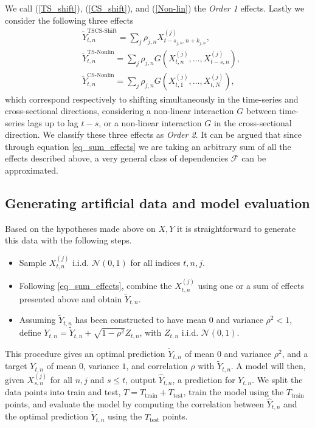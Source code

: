 \documentclass{article}
\begin{document}
We call (\ref{TS_shift}), (\ref{CS_shift}), and (\ref{Non-lin}) the \textit{Order 1} effects. Lastly we consider the following three effects
\begin{align}\label{tscs_shift}
&\widetilde Y_{t,n}^{\text{TSCS-Shift}} = \sum_j \rho_{j,n} X_{t-s_{j,n},n+k_{j,n}}^{(j)},\\
&\widetilde Y_{t,n}^{\text{TS-Nonlin}} = \sum_j \rho_{j,n} G(X_{t,n}^{(j)}, \dots, X_{t-s,n}^{(j)}),\\
&\widetilde Y_{t,n}^{\text{CS-Nonlin}} = \sum_j \rho_{j,n} G(X_{t,1}^{(j)}, \dots, X_{t,N}^{(j)}),
\end{align}
which correspond respectively to shifting simultaneously in the time-series and cross-sectional directions, considering a non-linear interaction $G$ between time-series lags up to lag $t-s$, or a non-linear interaction $G$ in the cross-sectional direction. We classify these three effects as \textit{Order 2}. It can be argued that since through equation \eqref{eq_sum_effects} we are taking an arbitrary sum of all the effects described above, a very general class of dependencies $\mathcal{F}$ can be approximated.

\subsection{Generating artificial data and model evaluation}

Based on the hypotheses made above on $X,Y$ it is straightforward to generate this data with the following steps.
\begin{itemize}
\item Sample $X_{t,n}^{(j)}$ i.i.d. $\mathcal{N}(0,1)$ for all indices $t,n,j$.
\item Following \eqref{eq_sum_effects}, combine the $X_{t,n}^{(j)}$ using one or a sum of effects presented above and obtain $\widetilde Y_{t,n}$.
\item Assuming $\widetilde Y_{t,n}$ has been constructed to have mean $0$ and variance $\rho^2 < 1$, define $Y_{t,n} = \widetilde Y_{t,n} + \sqrt{1 - \rho^2} Z_{t,n}$, with $Z_{t,n}$ i.i.d. $\mathcal{N}(0,1)$. 
\end{itemize}
This procedure gives an optimal prediction $\widetilde Y_{t,n}$ of mean $0$ and variance $\rho^2$, and a target $Y_{t,n}$ of mean $0$, variance $1$, and correlation $\rho$ with $\widetilde Y_{t,n}$. A model will then, given $X_{s,n}^{(j)}$ for all $n,j$ and $s \leq t$, output $\widehat Y_{t,n} $, a prediction for $Y_{t, n}$. We split the data points into train and test, $T = T_{\text{train}} + T_{\text{test}}$, train the model using the $T_{\text{train}}$ points, and evaluate the model by computing the correlation between $\widehat Y_{t,n}$ and the optimal prediction $\widetilde Y_{t,n}$ using the $T_{\text{test}}$ points.
\end{document}
